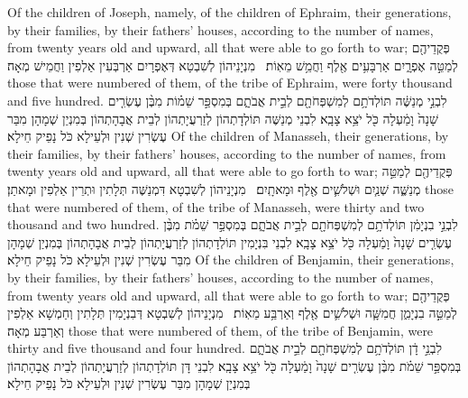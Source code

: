{Of the children of Joseph, namely, of the children of Ephraim, their generations, by their families, by their fathers’ houses, according to the number of names, from twenty years old and upward, all that were able to go forth to war;}{}
{פְּקֻדֵיהֶ֖ם לְמַטֵּ֣ה אֶפְרָ֑יִם אַרְבָּעִ֥ים אֶ֖לֶף וַחֲמֵ֥שׁ מֵאֽוֹת׃ \petucha }
{מִנְיָנֵיהוֹן לְשִׁבְטָא דְּאֶפְרָיִם אַרְבְּעִין אַלְפִין וַחֲמֵישׁ מְאָה׃}
{those that were numbered of them, of the tribe of Ephraim, were forty thousand and five hundred.}{}
{לִבְנֵ֣י מְנַשֶּׁ֔ה תּוֹלְדֹתָ֥ם לְמִשְׁפְּחֹתָ֖ם לְבֵ֣ית אֲבֹתָ֑ם בְּמִסְפַּ֣ר שֵׁמ֗וֹת מִבֶּ֨ן עֶשְׂרִ֤ים שָׁנָה֙ וָמַ֔עְלָה כֹּ֖ל יֹצֵ֥א צָבָֽא׃}
{לִבְנֵי מְנַשֶּׁה תּוֹלְדָתְהוֹן לְזַרְעֲיָתְהוֹן לְבֵית אֲבָהָתְהוֹן בְּמִנְיַן שְׁמָהָן מִבַּר עֶשְׂרִין שְׁנִין וּלְעֵילָא כֹּל נָפֵיק חֵילָא׃}
{Of the children of Manasseh, their generations, by their families, by their fathers’ houses, according to the number of names, from twenty years old and upward, all that were able to go forth to war;}{}
{פְּקֻדֵיהֶ֖ם לְמַטֵּ֣ה מְנַשֶּׁ֑ה שְׁנַ֧יִם וּשְׁלֹשִׁ֛ים אֶ֖לֶף וּמָאתָֽיִם׃ \petucha }
{מִנְיָנֵיהוֹן לְשִׁבְטָא דִּמְנַשֶּׁה תְּלָתִין וּתְרֵין אַלְפִין וּמָאתַן׃}
{those that were numbered of them, of the tribe of Manasseh, were thirty and two thousand and two hundred.}{}
{לִבְנֵ֣י בִנְיָמִ֔ן תּוֹלְדֹתָ֥ם לְמִשְׁפְּחֹתָ֖ם לְבֵ֣ית אֲבֹתָ֑ם בְּמִסְפַּ֣ר שֵׁמֹ֗ת מִבֶּ֨ן עֶשְׂרִ֤ים שָׁנָה֙ וָמַ֔עְלָה כֹּ֖ל יֹצֵ֥א צָבָֽא׃}
{לִבְנֵי בִּנְיָמִין תּוֹלְדָתְהוֹן לְזַרְעֲיָתְהוֹן לְבֵית אֲבָהָתְהוֹן בְּמִנְיַן שְׁמָהָן מִבַּר עֶשְׂרִין שְׁנִין וּלְעֵילָא כֹּל נָפֵיק חֵילָא׃}
{Of the children of Benjamin, their generations, by their families, by their fathers’ houses, according to the number of names, from twenty years old and upward, all that were able to go forth to war;}{}
{פְּקֻדֵיהֶ֖ם לְמַטֵּ֣ה בִנְיָמִ֑ן חֲמִשָּׁ֧ה וּשְׁלֹשִׁ֛ים אֶ֖לֶף וְאַרְבַּ֥ע מֵאֽוֹת׃ \petucha }
{מִנְיָנֵיהוֹן לְשִׁבְטָא דְּבִנְיָמִין תְּלָתִין וְחַמְשָׁא אַלְפִין וְאַרְבַּע מְאָה׃}
{those that were numbered of them, of the tribe of Benjamin, were thirty and five thousand and four hundred.}{}
{לִבְנֵ֣י דָ֔ן תּוֹלְדֹתָ֥ם לְמִשְׁפְּחֹתָ֖ם לְבֵ֣ית אֲבֹתָ֑ם בְּמִסְפַּ֣ר שֵׁמֹ֗ת מִבֶּ֨ן עֶשְׂרִ֤ים שָׁנָה֙ וָמַ֔עְלָה כֹּ֖ל יֹצֵ֥א צָבָֽא׃}
{לִבְנֵי דָּן תּוֹלְדָתְהוֹן לְזַרְעֲיָתְהוֹן לְבֵית אֲבָהָתְהוֹן בְּמִנְיַן שְׁמָהָן מִבַּר עֶשְׂרִין שְׁנִין וּלְעֵילָא כֹּל נָפֵיק חֵילָא׃}

